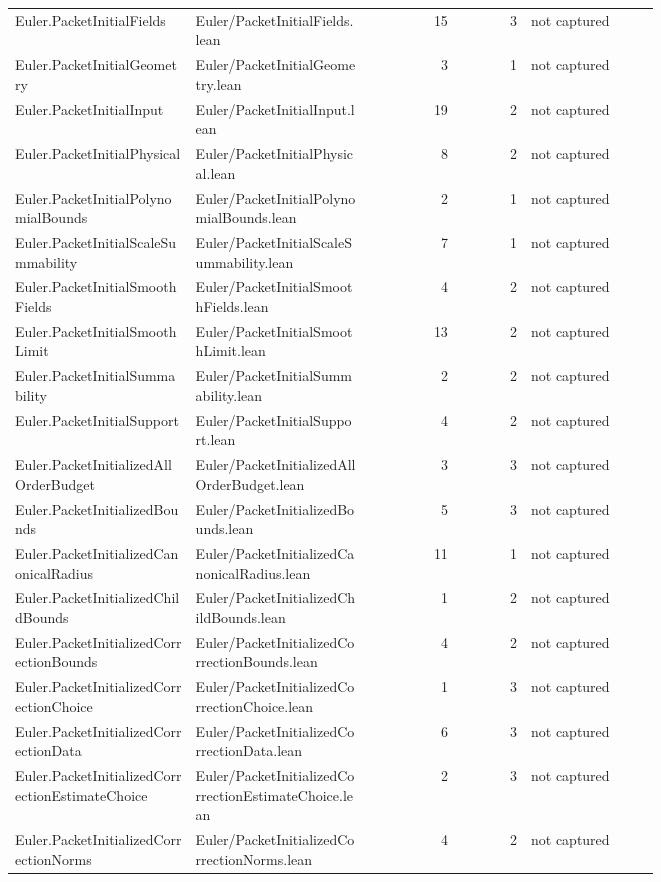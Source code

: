 \documentclass[10pt]{article}
\begin{document}
\begin{longtable}{p{0.28\linewidth}p{0.27\linewidth}r r p{0.20\linewidth}}
Euler.PacketInitialFields & Euler/PacketInitialFields.lean & 15 & 3 & not captured\\
Euler.PacketInitialGeometry & Euler/PacketInitialGeometry.lean & 3 & 1 & not captured\\
Euler.PacketInitialInput & Euler/PacketInitialInput.lean & 19 & 2 & not captured\\
Euler.PacketInitialPhysical & Euler/PacketInitialPhysical.lean & 8 & 2 & not captured\\
Euler.PacketInitialPolynomialBounds & Euler/PacketInitialPolynomialBounds.lean & 2 & 1 & not captured\\
Euler.PacketInitialScaleSummability & Euler/PacketInitialScaleSummability.lean & 7 & 1 & not captured\\
Euler.PacketInitialSmoothFields & Euler/PacketInitialSmoothFields.lean & 4 & 2 & not captured\\
Euler.PacketInitialSmoothLimit & Euler/PacketInitialSmoothLimit.lean & 13 & 2 & not captured\\
Euler.PacketInitialSummability & Euler/PacketInitialSummability.lean & 2 & 2 & not captured\\
Euler.PacketInitialSupport & Euler/PacketInitialSupport.lean & 4 & 2 & not captured\\
Euler.PacketInitializedAllOrderBudget & Euler/PacketInitializedAllOrderBudget.lean & 3 & 3 & not captured\\
Euler.PacketInitializedBounds & Euler/PacketInitializedBounds.lean & 5 & 3 & not captured\\
Euler.PacketInitializedCanonicalRadius & Euler/PacketInitializedCanonicalRadius.lean & 11 & 1 & not captured\\
Euler.PacketInitializedChildBounds & Euler/PacketInitializedChildBounds.lean & 1 & 2 & not captured\\
Euler.PacketInitializedCorrectionBounds & Euler/PacketInitializedCorrectionBounds.lean & 4 & 2 & not captured\\
Euler.PacketInitializedCorrectionChoice & Euler/PacketInitializedCorrectionChoice.lean & 1 & 3 & not captured\\
Euler.PacketInitializedCorrectionData & Euler/PacketInitializedCorrectionData.lean & 6 & 3 & not captured\\
Euler.PacketInitializedCorrectionEstimateChoice & Euler/PacketInitializedCorrectionEstimateChoice.lean & 2 & 3 & not captured\\
Euler.PacketInitializedCorrectionNorms & Euler/PacketInitializedCorrectionNorms.lean & 4 & 2 & not captured\\

\end{longtable}
\end{document}
